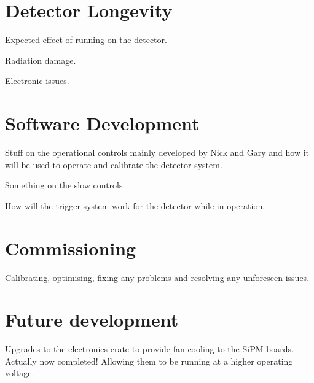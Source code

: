 \section{Detector Longevity}
Expected effect of running on the detector.

Radiation damage.

Electronic issues.
			
\section{Software Development}
			
Stuff on the operational controls mainly developed by Nick and Gary and how it will be used to operate and calibrate the detector system.
			
Something on the slow controls.
			
How will the trigger system work for the detector while in operation.
			
\section{Commissioning}
Calibrating, optimising, fixing any problems and resolving any unforeseen issues.

\section{Future development}
Upgrades to the electronics crate to provide fan cooling to the SiPM boards. Actually now completed! Allowing them to be running at a higher operating voltage.